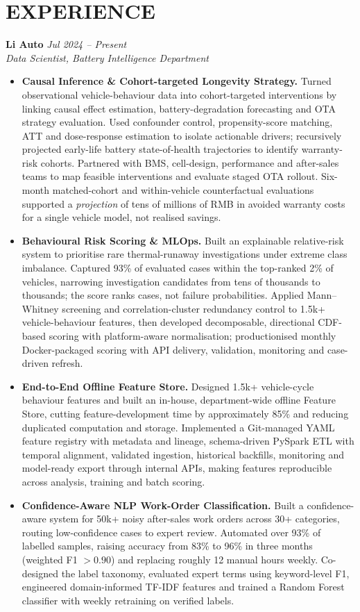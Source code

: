 \documentclass[a4paper,10pt]{article}
\begin{document}
\section{EXPERIENCE}
\textbf{Li Auto} \hfill \textit{Jul 2024 -- Present}\\
\textit{Data Scientist, Battery Intelligence Department}
\begin{itemize}
\item \textbf{Causal Inference \& Cohort-targeted Longevity Strategy.} Turned observational vehicle-behaviour data into cohort-targeted interventions by linking causal effect estimation, battery-degradation forecasting and OTA strategy evaluation. Used confounder control, propensity-score matching, ATT and dose-response estimation to isolate actionable drivers; recursively projected early-life battery state-of-health trajectories to identify warranty-risk cohorts. Partnered with BMS, cell-design, performance and after-sales teams to map feasible interventions and evaluate staged OTA rollout. Six-month matched-cohort and within-vehicle counterfactual evaluations supported a \emph{projection} of tens of millions of RMB in avoided warranty costs for a single vehicle model, not realised savings.
\item \textbf{Behavioural Risk Scoring \& MLOps.} Built an explainable relative-risk system to prioritise rare thermal-runaway investigations under extreme class imbalance. Captured 93\% of evaluated cases within the top-ranked 2\% of vehicles, narrowing investigation candidates from tens of thousands to thousands; the score ranks cases, not failure probabilities. Applied Mann--Whitney screening and correlation-cluster redundancy control to 1.5k+ vehicle-behaviour features, then developed decomposable, directional CDF-based scoring with platform-aware normalisation; productionised monthly Docker-packaged scoring with API delivery, validation, monitoring and case-driven refresh.
\item \textbf{End-to-End Offline Feature Store.} Designed 1.5k+ vehicle-cycle behaviour features and built an in-house, department-wide offline Feature Store, cutting feature-development time by approximately 85\% and reducing duplicated computation and storage. Implemented a Git-managed YAML feature registry with metadata and lineage, schema-driven PySpark ETL with temporal alignment, validated ingestion, historical backfills, monitoring and model-ready export through internal APIs, making features reproducible across analysis, training and batch scoring.
\item \textbf{Confidence-Aware NLP Work-Order Classification.} Built a confidence-aware system for 50k+ noisy after-sales work orders across 30+ categories, routing low-confidence cases to expert review. Automated over 93\% of labelled samples, raising accuracy from 83\% to 96\% in three months (weighted F1 $>0.90$) and replacing roughly 12 manual hours weekly. Co-designed the label taxonomy, evaluated expert terms using keyword-level F1, engineered domain-informed TF-IDF features and trained a Random Forest classifier with weekly retraining on verified labels.
\end{itemize}
\end{document}
